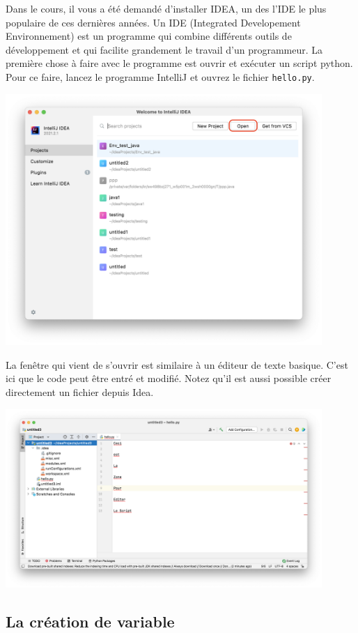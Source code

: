 Dans le cours, il vous a été demandé d'installer IDEA, un des l'IDE le plus populaire de ces dernières années. Un IDE (Integrated Developement Environnement) est un programme qui combine différents outils de développement et qui facilite grandement le travail d'un programmeur. La première chose à faire avec le programme est ouvrir et exécuter un script python. Pour ce faire, lancez le programme IntelliJ et ouvrez le fichier \lstinline{hello.py}.
\begin{center}
	\includegraphics[width=12cm]{2}	
\end{center}

La fenêtre qui vient de s'ouvrir est similaire à un éditeur de texte basique. C'est ici que le code peut être entré et modifié. Notez qu'il est aussi possible créer directement un fichier depuis Idea.
\begin{center}
	\includegraphics[width=12cm]{3}	
\end{center}


\subsection{La création de variable}

